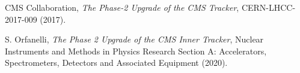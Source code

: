 \documentclass[a4paper,11pt]{article}
\begin{document}
\begin{thebibliography}{99}

%

CMS Collaboration, \emph{The Phase-2 Upgrade of the CMS Tracker},
CERN-LHCC-2017-009 (2017).

%

S. Orfanelli, \emph{The Phase 2 Upgrade of the CMS Inner Tracker},
Nuclear Instruments and Methods in Physics Research Section A: Accelerators, Spectrometers, Detectors and Associated Equipment (2020).


\end{thebibliography}
\end{document}
